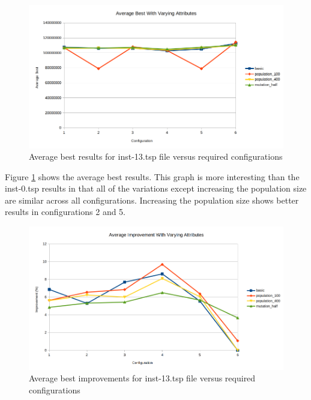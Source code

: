 \begin{figure}[H]
\vspace{-5pt}
\centering
\includegraphics[width=1.0\textwidth]{images/inst-13-average-best.png}
\caption{\label{fig:inst-13-average-best}Average best results for inst-13.tsp file versus required configurations}
\end{figure}

Figure \ref{fig:inst-13-average-best} shows the average best results. This graph is more interesting than the inst-0.tsp results in that all of the variations except increasing the population size are similar across all configurations. Increasing the population size shows better results in configurations 2 and 5. 

\begin{figure}[H]
\vspace{-5pt}
\centering
\includegraphics[width=1.0\textwidth]{images/inst-13-best-improvements.png}
\caption{\label{fig:inst-13-best-improvements}Average best improvements for inst-13.tsp file versus required configurations}
\end{figure}


